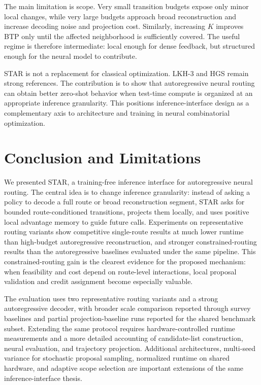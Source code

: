 \documentclass[11pt]{article}
\newcommand{\BTP}{\textsc{BTP}}
\newcommand{\method}{\textsc{STAR}}
\begin{document}
The main limitation is scope. Very small transition budgets expose only minor local changes, while very large budgets approach broad reconstruction and increase decoding noise and projection cost. Similarly, increasing $K$ improves \BTP{} only until the affected neighborhood is sufficiently covered. The useful regime is therefore intermediate: local enough for dense feedback, but structured enough for the neural model to contribute.

\method{} is not a replacement for classical optimization. LKH-3 and HGS remain strong references. The contribution is to show that autoregressive neural routing can obtain better zero-shot behavior when test-time compute is organized at an appropriate inference granularity. This positions inference-interface design as a complementary axis to architecture and training in neural combinatorial optimization.

\section{Conclusion and Limitations}

We presented \method{}, a training-free inference interface for autoregressive neural routing. The central idea is to change inference granularity: instead of asking a policy to decode a full route or broad reconstruction segment, \method{} asks for bounded route-conditioned transitions, projects them locally, and uses positive local advantage memory to guide future calls. Experiments on representative routing variants show competitive single-route results at much lower runtime than high-budget autoregressive reconstruction, and stronger constrained-routing results than the autoregressive baselines evaluated under the same pipeline. This constrained-routing gain is the clearest evidence for the proposed mechanism: when feasibility and cost depend on route-level interactions, local proposal validation and credit assignment become especially valuable.

The evaluation uses two representative routing variants and a strong autoregressive decoder, with broader scale comparison reported through survey baselines and partial projection-baseline runs reported for the shared benchmark subset. Extending the same protocol requires hardware-controlled runtime measurements and a more detailed accounting of candidate-list construction, neural evaluation, and trajectory projection. Additional architectures, multi-seed variance for stochastic proposal sampling, normalized runtime on shared hardware, and adaptive scope selection are important extensions of the same inference-interface thesis.
\end{document}

